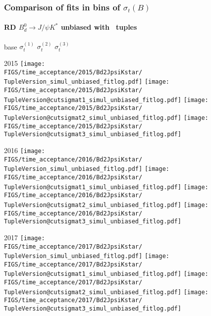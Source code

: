 \begin{frame} %
\frametitle{Comparison of fits in bins of $\sigma_t(B)$}
\framesubtitle{RD $B_d^0\rightarrow J/\psi K^*$ unbiased with \TupleVersion\, tuples}

  \phantom{2020} base \hspace*{1.5cm} $\sigma_t^{(1)}$ \hspace*{1.5cm} $\sigma_t^{(2)}$ \hspace*{1.5cm} $\sigma_t^{(3)}$

  2015
  \texttt{[image: \\FIGS/time\_acceptance/2015/Bd2JpsiKstar/\\TupleVersion\_simul\_unbiased\_fitlog.pdf]}
  \texttt{[image: \\FIGS/time\_acceptance/2015/Bd2JpsiKstar/\\TupleVersion@cutsigmat1\_simul\_unbiased\_fitlog.pdf]}
  \texttt{[image: \\FIGS/time\_acceptance/2015/Bd2JpsiKstar/\\TupleVersion@cutsigmat2\_simul\_unbiased\_fitlog.pdf]}
  \texttt{[image: \\FIGS/time\_acceptance/2015/Bd2JpsiKstar/\\TupleVersion@cutsigmat3\_simul\_unbiased\_fitlog.pdf]}
  \vspace*{2mm}

  2016
  \texttt{[image: \\FIGS/time\_acceptance/2016/Bd2JpsiKstar/\\TupleVersion\_simul\_unbiased\_fitlog.pdf]}
  \texttt{[image: \\FIGS/time\_acceptance/2016/Bd2JpsiKstar/\\TupleVersion@cutsigmat1\_simul\_unbiased\_fitlog.pdf]}
  \texttt{[image: \\FIGS/time\_acceptance/2016/Bd2JpsiKstar/\\TupleVersion@cutsigmat2\_simul\_unbiased\_fitlog.pdf]}
  \texttt{[image: \\FIGS/time\_acceptance/2016/Bd2JpsiKstar/\\TupleVersion@cutsigmat3\_simul\_unbiased\_fitlog.pdf]}
  \vspace*{2mm}

  2017
  \texttt{[image: \\FIGS/time\_acceptance/2017/Bd2JpsiKstar/\\TupleVersion\_simul\_unbiased\_fitlog.pdf]}
  \texttt{[image: \\FIGS/time\_acceptance/2017/Bd2JpsiKstar/\\TupleVersion@cutsigmat1\_simul\_unbiased\_fitlog.pdf]}
  \texttt{[image: \\FIGS/time\_acceptance/2017/Bd2JpsiKstar/\\TupleVersion@cutsigmat2\_simul\_unbiased\_fitlog.pdf]}
  \texttt{[image: \\FIGS/time\_acceptance/2017/Bd2JpsiKstar/\\TupleVersion@cutsigmat3\_simul\_unbiased\_fitlog.pdf]}
  \vspace*{2mm}


\end{frame}
